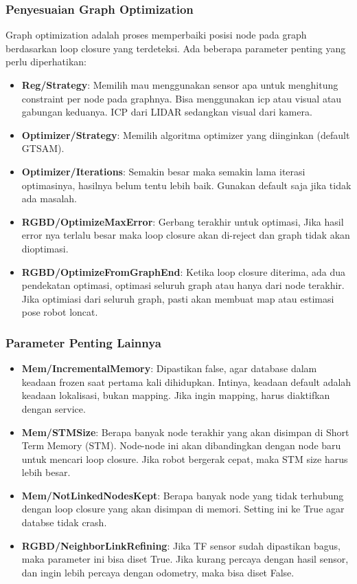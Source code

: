 \documentclass{article}
\begin{document}
\subsubsection{Penyesuaian Graph Optimization}
Graph optimization adalah proses memperbaiki posisi node pada graph berdasarkan loop closure yang terdeteksi. Ada beberapa parameter penting yang perlu diperhatikan:
\begin{itemize}
  \item \textbf{Reg/Strategy}: Memilih mau menggunakan sensor apa untuk menghitung constraint per node pada graphnya. Bisa menggunakan icp atau visual atau gabungan keduanya. ICP dari LIDAR sedangkan visual dari kamera.
  \item \textbf{Optimizer/Strategy}: Memilih algoritma optimizer yang diinginkan (default GTSAM).
  \item \textbf{Optimizer/Iterations}: Semakin besar maka semakin lama iterasi optimasinya, hasilnya belum tentu lebih baik. Gunakan default saja jika tidak ada masalah.
  \item \textbf{RGBD/OptimizeMaxError}: Gerbang terakhir untuk optimasi, Jika hasil error nya terlalu besar maka loop closure akan di-reject dan graph tidak akan dioptimasi.
  \item \textbf{RGBD/OptimizeFromGraphEnd}: Ketika loop closure diterima, ada dua pendekatan optimasi, optimasi seluruh graph atau hanya dari node terakhir. Jika optimiasi dari seluruh graph, pasti akan membuat map atau estimasi pose robot loncat.
\end{itemize}

\subsubsection{Parameter Penting Lainnya}
\begin{itemize}
  \item \textbf{Mem/IncrementalMemory}: Dipastikan false, agar database dalam keadaan frozen saat pertama kali dihidupkan. Intinya, keadaan default adalah keadaan lokalisasi, bukan mapping. Jika ingin mapping, harus diaktifkan dengan service.
  \item \textbf{Mem/STMSize}: Berapa banyak node terakhir yang akan disimpan di Short Term Memory (STM). Node-node ini akan dibandingkan dengan node baru untuk mencari loop closure. Jika robot bergerak cepat, maka STM size harus lebih besar.
  \item \textbf{Mem/NotLinkedNodesKept}: Berapa banyak node yang tidak terhubung dengan loop closure yang akan disimpan di memori. Setting ini ke True agar databse tidak crash.
  \item \textbf{RGBD/NeighborLinkRefining}: Jika TF sensor sudah dipastikan bagus, maka parameter ini bisa diset True. Jika kurang percaya dengan hasil sensor, dan ingin lebih percaya dengan odometry, maka bisa diset False.
\end{itemize}
\end{document}
